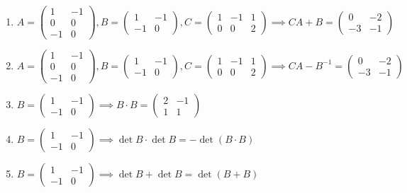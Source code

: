 \documentclass[11pt,a4paper]{article}
\begin{document}
\begin{enumerate}
\item $\displaystyle A = \begin{pmatrix} 1 & -1 \\ 0 & 0 \\ -1 & 0 \end{pmatrix}, B = \begin{pmatrix} 1 & -1 \\ -1 & 0 \end{pmatrix}, C = \begin{pmatrix} 1 & -1 & 1 \\ 0 & 0 & 2 \end{pmatrix} \implies C A + B = \begin{pmatrix} 0 & -2 \\ -3 & -1 \end{pmatrix}$
\item $\displaystyle A = \begin{pmatrix} 1 & -1 \\ 0 & 0 \\ -1 & 0 \end{pmatrix}, B = \begin{pmatrix} 1 & -1 \\ -1 & 0 \end{pmatrix}, C = \begin{pmatrix} 1 & -1 & 1 \\ 0 & 0 & 2 \end{pmatrix} \implies C A - B^{-1} = \begin{pmatrix} 0 & -2 \\ -3 & -1 \end{pmatrix}$
\item $\displaystyle B = \begin{pmatrix} 1 & -1 \\ -1 & 0 \end{pmatrix} \implies B \cdot B = \begin{pmatrix} 2 & -1 \\ 1 & 1 \end{pmatrix}$
\item $\displaystyle B = \begin{pmatrix} 1 & -1 \\ -1 & 0 \end{pmatrix} \implies \det B \cdot \det B = -\det\left( B \cdot B \right)$
\item $\displaystyle B = \begin{pmatrix} 1 & -1 \\ -1 & 0 \end{pmatrix} \implies \det B + \det B = \det\left( B + B \right)$

\end{enumerate}
\end{document}
